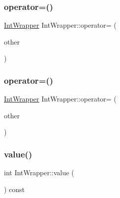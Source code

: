 \mbox{\label{class_int_wrapper_a39077b3c0eb1dd8a296a81bfb0a047b3}} 
\subsubsection{\texorpdfstring{operator=()}{operator=()}\hspace{0.1cm}{\footnotesize\ttfamily [2/3]}}
{\footnotesize\ttfamily \mbox{\hyperlink{class_int_wrapper}{Int\+Wrapper}} Int\+Wrapper\+::operator= (\begin{DoxyParamCaption}\item[{const \mbox{\hyperlink{class_int_wrapper}{Int\+Wrapper}} \&}]{other }\end{DoxyParamCaption})\hspace{0.3cm}{\ttfamily [inline]}}

\mbox{\label{class_int_wrapper_a39077b3c0eb1dd8a296a81bfb0a047b3}} 
\subsubsection{\texorpdfstring{operator=()}{operator=()}\hspace{0.1cm}{\footnotesize\ttfamily [3/3]}}
{\footnotesize\ttfamily \mbox{\hyperlink{class_int_wrapper}{Int\+Wrapper}} Int\+Wrapper\+::operator= (\begin{DoxyParamCaption}\item[{const \mbox{\hyperlink{class_int_wrapper}{Int\+Wrapper}} \&}]{other }\end{DoxyParamCaption})\hspace{0.3cm}{\ttfamily [inline]}}

\mbox{\label{class_int_wrapper_a6103e9dc5eb94678985e3c2ac481b508}} 
\subsubsection{\texorpdfstring{value()}{value()}\hspace{0.1cm}{\footnotesize\ttfamily [1/3]}}
{\footnotesize\ttfamily int Int\+Wrapper\+::value (\begin{DoxyParamCaption}{ }\end{DoxyParamCaption}) const\hspace{0.3cm}{\ttfamily [inline]}}

